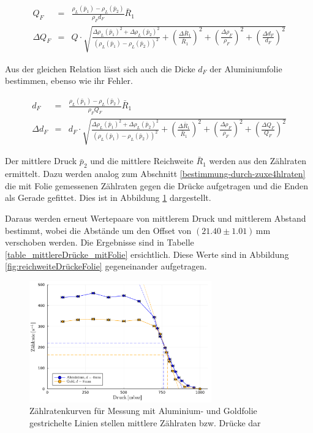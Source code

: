 \documentclass[12pt,a4paper]{scrartcl}
\numberwithin{equation}{section} %
\begin{document}
\begin{eqnarray}
	Q_F &=& \frac{\rho_L(\bar{p}_1) - \rho_L(\bar{p}_2)}{\rho_F d_F} \bar{R}_1
	\label{eq:Q_F} \\
	\Delta Q_F &=& Q \cdot \sqrt{\frac{{\Delta \rho_L(\bar{p}_1)}^2 + {\Delta \rho_L(\bar{p}_2)}^2}{\left(\rho_L(\bar{p}_1) - \rho_L(\bar{p}_2)\right)^2} + \left(\frac{\Delta \bar{R}_1}{\bar{R}_1}\right)^2 + \left(\frac{\Delta \rho_F}{\rho_F}\right)^2 + \left(\frac{\Delta d_F}{d_F}\right)^2}
\label{eq:fehler_Q_F}
\end{eqnarray}

Aus der gleichen Relation lässt sich auch die Dicke $d_F$ der Aluminiumfolie bestimmen, ebenso wie ihr Fehler.

\begin{eqnarray}
	d_F &=& \frac{\rho_L(\bar{p}_1) - \rho_L(\bar{p}_2)}{\rho_F Q_F} \bar{R}_1 \label{eq:d_F} \\
	\Delta d_F &=& d_F \cdot
		\sqrt{\frac{{\Delta \rho_L(\bar{p}_1)}^2 + {\Delta \rho_L(\bar{p}_2)}^2}{\left(\rho_L(\bar{p}_1) - \rho_L(\bar{p}_2)\right)^2} + \left(\frac{\Delta \bar{R}_1}{\bar{R}_1}\right)^2 + \left(\frac{\Delta \rho_F}{\rho_F}\right)^2 + \left(\frac{\Delta Q_F}{Q_F}\right)^2}
	\label{eq:fehler_d_F}
\end{eqnarray}

Der mittlere Druck $\bar{p}_2$ und die mittlere Reichweite $\bar{R}_1$ werden aus den Zählraten ermittelt. Dazu werden analog zum Abschnitt \ref{bestimmung-durch-zuxe4hlraten} die mit Folie gemessenen Zählraten gegen die Drücke aufgetragen und die Enden als Gerade  gefittet. Dies ist in Abbildung \ref{fig:zählraten mit folien} dargestellt.

Daraus werden erneut Wertepaare von mittlerem Druck und mittlerem Abstand bestimmt, wobei die Abstände um den Offset von $(21.40 \pm 1.01) \mathrm{\, mm}$ verschoben werden. Die Ergebnisse sind in Tabelle \ref{table_mittlereDrücke_mitFolie} ersichtlich. Diese Werte sind in Abbildung \ref{fig:reichweiteDrückeFolie} gegeneinander aufgetragen.

\begin{figure}[H]
	\centering
	\includegraphics[width=0.7\textwidth]{../media/B3.3/zaehlraten.pdf}
	\caption{Zählratenkurven für Messung mit Aluminium- und Goldfolie \\
			gestrichelte Linien stellen mittlere Zählraten bzw. Drücke dar}
	\label{fig:zählraten mit folien}
\end{figure}
\end{document}
